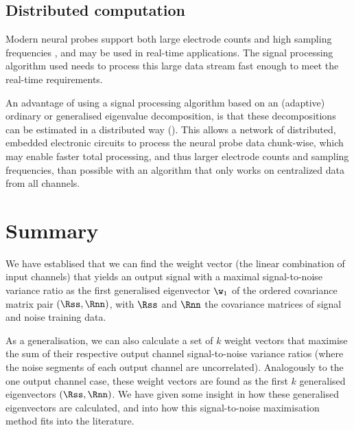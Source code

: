 \subsection{Distributed computation}

Modern neural probes support both large electrode counts and high sampling
frequencies \cite{Jun2017}, and may be used in real-time applications. The
signal processing algorithm used needs to process this large data stream fast
enough to meet the real-time requirements.

An advantage of using a signal processing algorithm based on an (adaptive)
ordinary or generalised eigenvalue decomposition, is that these
decompositions can be estimated in a distributed way
(\cite{Bertrand2014,Bertrand2015}). This allows a network of distributed,
embedded electronic circuits to process the neural probe data chunk-wise,
which may enable faster total processing, and thus larger electrode counts
and sampling frequencies, than possible with an algorithm that only works on
centralized data from all channels.




\section{Summary}

We have establised that we can find the weight vector (the linear combination
of input channels) that yields an output signal with a maximal
signal-to-noise variance ratio as the first generalised eigenvector $\w_1$
of the ordered covariance matrix pair $(\Rss,\Rnn)$, with $\Rss$ and $\Rnn$
the covariance matrices of signal and noise training data.

As a generalisation, we can also calculate a set of $k$ weight vectors that
maximise the sum of their respective output channel signal-to-noise variance
ratios (where the noise segments of each output channel are uncorrelated).
Analogously to the one output channel case, these weight vectors are found as
the first $k$ generalised eigenvectors $(\Rss, \Rnn)$. We have given some
insight in how these generalised eigenvectors are calculated, and into how
this signal-to-noise maximisation method fits into the literature.
